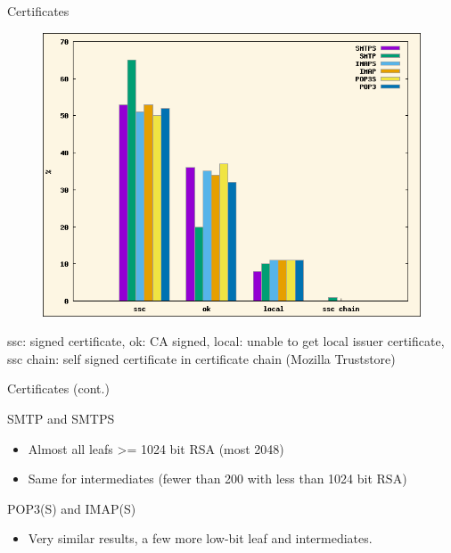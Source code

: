 \begin{frame}{Certificates}

\begin{figure}[h!]
\centering
  \includegraphics[scale=0.40]{pki}
\end{figure}

ssc: signed certificate, ok: CA signed, local: unable to get local
issuer certificate, ssc chain: self signed certificate in certificate
chain (Mozilla Truststore)

\end{frame}

\begin{frame}{Certificates (cont.)}

\begin{block}{SMTP and SMTPS}

\begin{itemize}
\itemsep1pt\parskip0pt
\item
  Almost all leafs \textgreater{}= 1024 bit RSA (most 2048)
\item
  Same for intermediates (fewer than 200 with less than 1024 bit RSA)
\end{itemize}

\end{block}

\begin{block}{POP3(S) and IMAP(S)}

\begin{itemize}
\itemsep1pt\parskip0pt
\item
  Very similar results, a few more low-bit leaf and intermediates.
\end{itemize}

\end{block}

\end{frame}

